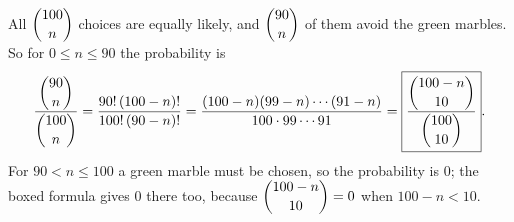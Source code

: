 All $\dbinom{100}{n}$ choices are equally likely, and $\dbinom{90}{n}$ of them avoid the green marbles. So for $0\le n\le90$ the probability is
\[\dfrac{\dbinom{90}{n}}{\dbinom{100}{n}}=\dfrac{90!\,(100-n)!}{100!\,(90-n)!}=\dfrac{(100-n)(99-n)\cdots(91-n)}{100\cdot99\cdots91}=\boxed{\dfrac{\dbinom{100-n}{10}}{\dbinom{100}{10}}}.\]
For $90<n\le100$ a green marble must be chosen, so the probability is $0$; the boxed formula gives $0$ there too, because $\dbinom{100-n}{10}=0$ when $100-n<10$.

